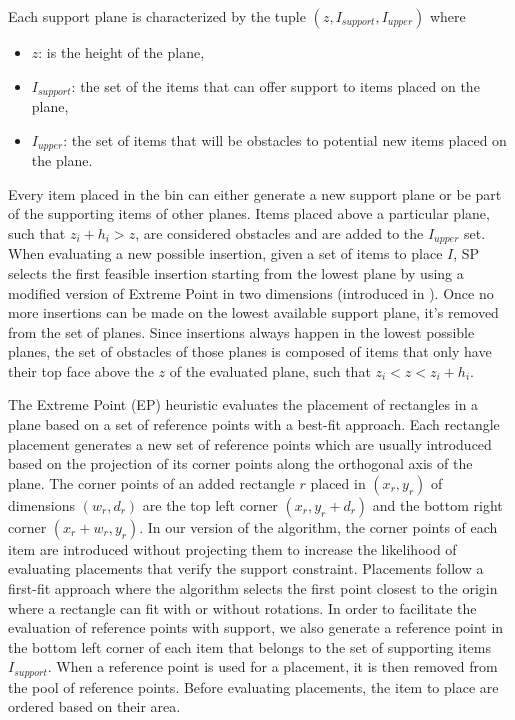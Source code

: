 Each support plane is characterized by the tuple $(z, I_{support}, I_{upper})$ where
\begin{itemize}
    \item $z$: is the height of the plane,
    \item $I_{support}$: the set of the items that can offer support to items placed on the plane,
    \item $I_{upper}$: the set of items that will be obstacles to potential new items placed on the plane.
\end{itemize}

Every item placed in the bin can either generate a new support plane or be part of the supporting items of other planes. 
Items placed above a particular plane, such that $z_i + h_i > z$, are considered obstacles and are added to the $I_{upper}$ set.
When evaluating a new possible insertion, given a set of items to place $I$, SP selects the first feasible insertion starting from the lowest plane by using a modified version of Extreme Point in two dimensions (introduced in \cite{crainic2008extreme}).
Once no more insertions can be made on the lowest available support plane, it's removed from the set of planes.
Since insertions always happen in the lowest possible planes, the set of obstacles of those planes is composed of items that only have their top face above the $z$ of the evaluated plane, such that $z_i < z < z_i + h_i$.

The Extreme Point (EP) heuristic evaluates the placement of rectangles in a plane based on a set of reference points with a best-fit approach. 
Each rectangle placement generates a new set of reference points which are usually introduced based on the projection of its corner points along the orthogonal axis of the plane.
The corner points of an added rectangle $r$ placed in $(x_r, y_r)$ of dimensions $(w_r, d_r)$ are the top left corner $(x_r, y_r + d_r)$ and the bottom right corner $(x_r + w_r, y_r)$.
In our version of the algorithm, the corner points of each item are introduced without projecting them to increase the likelihood of evaluating placements that verify the support constraint.
Placements follow a first-fit approach where the algorithm selects the first point closest to the origin where a rectangle can fit with or without rotations.
In order to facilitate the evaluation of reference points with support, we also generate a reference point in the bottom left corner of each item that belongs to the set of supporting items $I_{support}$.
When a reference point is used for a placement, it is then removed from the pool of reference points.
Before evaluating placements, the item to place are ordered based on their area.

